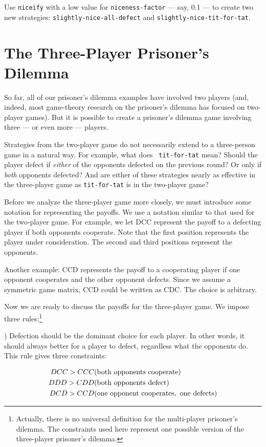 Use {\tt niceify} with a low value for {\tt niceness-factor} --- say,
0.1 --- to create two new strategies: {\tt slightly-nice-all-defect}
and {\tt slightly-nice-tit-for-tat}.

\section{The Three-Player Prisoner's Dilemma}

So far, all of our prisoner's dilemma examples have involved two
players (and, indeed, most game-theory research on the prisoner's
dilemma has focused on two-player games). But it is possible to create
a prisoner's dilemma game involving three --- or even more ---
players.

Strategies from the two-player game do not necessarily extend to a
three-person game in a natural way. For example, what does {\tt
tit-for-tat} mean? Should the player defect if {\it either} of the
opponents defected on the previous round? Or only if {\it both}
opponents defected? And are either of these strategies nearly as
effective in the three-player game as {\tt tit-for-tat} is in the
two-player game?

Before we analyze the three-player game more closely, we must
introduce some notation for representing the payoffs. We use a
notation similar to that used for the two-player game. For example, we
let DCC represent the payoff to a defecting player if both opponents
cooperate. Note that the first position represents the player under
consideration. The second and third positions represent the opponents.

Another example: CCD represents the payoff to a cooperating player if
one opponent cooperates and the other opponent defects.  Since we
assume a symmetric game matrix, CCD could be written as CDC. The
choice is arbitrary.

Now we are ready to discuss the payoffs for the three-player game. We
impose three rules:\footnote{Actually, there is no universal
definition for the multi-player prisoner's dilemma. The constraints
used here represent one possible version of the three-player
prisoner's dilemma.}

) Defection should be the dominant choice for each player.
In other words, it should always better for a player to defect,
regardless what the opponents do. This rule gives three constraints:


\begin{eqnarray*}
DCC > CCC  & {\rm (both\ opponents\ cooperate)}\\
DDD > CDD  & {\rm (both\ opponents\ defect)}\\
DCD > CCD  & {\rm (one\ opponent\ cooperates,\ one\ defects)}
\end{eqnarray*}


